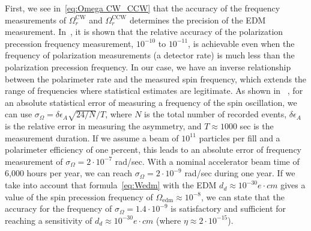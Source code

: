 \documentclass[a4paper]{jacow}
\begin{document}
First, we see in~\eqref{eq:Omega CW_CCW} that the accuracy of the frequency measurements
of $\Omega_{r}^{\mathrm{CW}}$ and $\Omega_{r}^{\mathrm{CCW}}$   determines the precision of the EDM measurement.
In~\cite{Eversmann}, it is shown that the relative accuracy of the polarization precession frequency
measurement, $10^{-10}$ to $10^{-11}$,   is achievable even when the frequency of polarization measurements (a detector rate) is much less than the polarization precession frequency. In our case, we have an inverse relationship between the polarimeter rate and the measured spin frequency, which extends the range of frequencies where statistical estimates are legitimate. As shown in ~\cite{Aksentyev}, for an absolute statistical error of measuring a frequency of the spin oscillation, we can use $\sigma_{\Omega}=\delta\epsilon_{A}\sqrt{24/N}/T$, where $N$  is the total number of recorded events, $\delta\epsilon_{A}$   is the relative error in measuring the asymmetry, and $T\approx 1000$  sec is the measurement duration. If we assume a beam of $10^{11}$  particles per fill and a polarimeter efficiency of one percent, this leads to an absolute error of frequency measurement of  $\sigma_{\Omega}=2\cdot10^{-7}$ rad/sec. With a nominal accelerator beam time of 6,000 hours per year, we can reach $\sigma_{\Omega}=2\cdot10^{-9}$ rad/sec during one year. If we take into account that formula~\eqref{eq:Wedm} with the EDM $d_d\approx 10^{-30} e\cdot cm$  gives a value of the spin precession frequency of $\Omega_{\mathrm{edm}}\approx 10^{-8}$, we can state that the accuracy for the frequency of $\sigma_{\Omega}=1.4\cdot10^{-9}$   is satisfactory and sufficient for reaching a sensitivity of $d_d\approx 10^{-30}e\cdot cm$ (where $\eta\approx2\cdot10^{-15}$).

\end{document}
